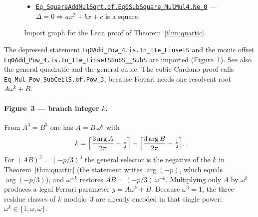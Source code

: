 \documentclass[11pt,a4paper]{article}
\newcommand{\Arg}{\operatorname{arg}}
\begin{document}
\begin{figure}[ht]
\begin{itemize}[leftmargin=1.2em,itemsep=0.15em]
\begin{itemize}[leftmargin=1.1em,itemsep=0.1em]
\begin{itemize}[leftmargin=1.1em,itemsep=0.05em]
\begin{itemize}[leftmargin=1.1em,itemsep=0.05em]
        \href{http://www.lemma.cn/lean/?module=Complex.ArgPow.eq.SubMul_Arg}{\texttt{ArgPow.eq.SubMul\_Arg}},
        \href{http://www.lemma.cn/lean/?module=Complex.Eq_MulNorm_ExpMulIArg}{\texttt{Eq\_MulNorm\_ExpMulIArg}},
        \href{http://www.lemma.cn/lean/?module=Complex.ArgExpMulI.eq.Sub_Mul_Ceil}{\texttt{ArgExpMulI.eq.Sub\_Mul\_Ceil}},
        \href{http://www.lemma.cn/lean/?module=Int.Floor.eq.NegCeilNeg}{\texttt{Int.Floor.eq.NegCeilNeg}})
        \item \href{http://www.lemma.cn/lean/?module=Complex.Eq_SquareAddMulSqrt.of.Eq0SubSquare_MulMul4.Ne_0}{\texttt{Eq\_SquareAddMulSqrt.of.Eq0SubSquare\_MulMul4.Ne\_0}} --- \(\Delta=0\Rightarrow ax^2+bx+c\) is a square
      \end{itemize}
    \end{itemize}
  \end{itemize}
\end{itemize}
\caption{Import graph for the Lean proof of Theorem~\ref{thm:quartic}.}
\label{fig:deps}
\end{figure}

The depressed statement
\href{http://www.lemma.cn/lean/?module=Complex.Eq0Add_Pow_4.is.In_Ite_FinsetS}{\texttt{Eq0Add\_Pow\_4.is.In\_Ite\_FinsetS}}
and the monic offset
\href{http://www.lemma.cn/lean/?module=Complex.Eq0Add_Pow_4.is.In_Ite_FinsetSSubS__SubS}{\texttt{Eq0Add\_Pow\_4.is.In\_Ite\_FinsetSSubS\_\_SubS}}
are imported (Figure~\ref{fig:deps}).
See also the general quadratic and the general cubic.
The cubic Cardano proof calls \texttt{Eq\_Mul\_Pow\_SubCeilS.of.Pow\_3}, because Ferrari needs one resolvent root \(A\omega^{k}+B\).

\paragraph{Figure~3 --- branch integer \(k\).}
From \(A^3=B^3\) one has \(A=B\,\omega^{k}\) with
\[
k=\Bigl\lceil\frac{3\Arg A}{2\pi}-\tfrac12\Bigr\rceil
-\Bigl\lceil\frac{3\Arg B}{2\pi}-\tfrac12\Bigr\rceil.
\]
For \((AB)^3=(-p/3)^3\) the general selector is the negative of the \(k\) in Theorem~\ref{thm:quartic} (the statement writes \(\Arg(-p)\), which equals \(\Arg(-p/3)\)), and \(\omega^{-k}\) restores \(AB=(-p/3)\,\omega^{-k}\).
Multiplying only \(A\) by \(\omega^{k}\) produces a legal Ferrari parameter \(y=A\omega^{k}+B\).
Because \(\omega^{3}=1\), the three residue classes of \(k\) modulo~3 are already encoded in that single power: \(\omega^{k}\in\{1,\omega,\overline{\omega}\}\).
\end{document}
